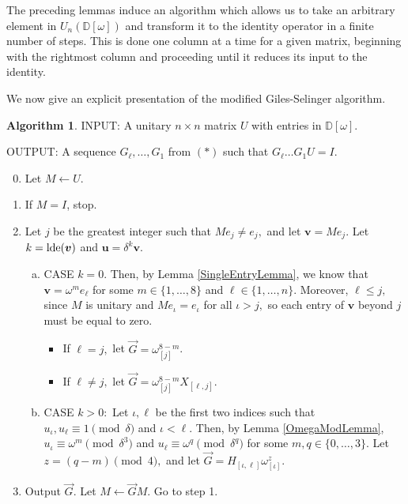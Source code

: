\documentclass{dalthesis}
\theoremstyle{theorem}
\theoremstyle{definition}
\newtheorem{algorithm}[theorem]{Algorithm}
\theoremstyle{definition}  %
\theoremstyle{definition}
\newcommand{\D}{\mathbb{D}}
\newcommand{\jay}{j}
\renewcommand{\:}{\mathbin{:}}
\newcommand{\lde}{\mathop{\rm lde}\nolimits}
\renewcommand{\vec}{\overrightarrow}
\begin{document}
The preceding lemmas induce an algorithm which allows us to take an arbitrary element in $U_n(\D[\omega])$ and transform it to the identity operator in a finite number of steps. This is done one column at a time for a given matrix, beginning with the rightmost column and proceeding until it reduces its input to the identity. 

We now give an explicit presentation of the modified Giles-Selinger algorithm.

\begin{algorithm}
\label{GSAlg}
INPUT: A unitary $n\times n$ matrix $U$ with entries in $\D[\omega].$

OUTPUT: A sequence $G_\ell,\ldots ,G_1$ from $(*)$ such that $G_\ell\ldots G_1U = I.$

\begin{enumerate}\setcounter{enumi}{-1}
\item Let $M\leftarrow U$.
\item If $M = I$, stop.
\item Let $\jay$ be the greatest integer such that $Me_{\jay}\neq e_{\jay},$ and let $\boldsymbol{v} = Me_{\jay}.$ Let $k = \lde(\boldsymbol{v})$ and $\boldsymbol{u} = \delta^k\boldsymbol{v}.$
\begin{enumerate}[(a)]
\item CASE $k = 0.$ Then, by Lemma \ref{SingleEntryLemma}, we know that $\boldsymbol{v} = \omega^me_{\ell}$ for some $m\in\{1,\ldots ,8\}$ and $\ell\in\{1,\ldots ,n\}.$ Moreover, $\ell\leq\jay,$ since $M$ is unitary and $Me_{\iota} = e_{\iota}$ for all $\iota>\jay,$ so each entry of $\boldsymbol{v}$ beyond $\jay$ must be equal to zero.
\begin{itemize}
\item If $\ell = \jay,$ let $\vec{G} = \omega^{8-m}_{[\jay]}$.

\item If $\ell\neq\jay,$ let $\vec{G} = \omega^{8-m}_{[\jay]}X_{[\ell,\jay]}.$
\end{itemize}
\item CASE $k > 0:$ Let $\iota,\ell$ be the first two indices such that $u_\iota,u_\ell\equiv 1\pmod{\delta}$ and $\iota < \ell.$ Then, by Lemma \ref{OmegaModLemma}, $u_\iota\equiv\omega^m\pmod{\delta^3}$ and $u_\ell\equiv\omega^q\pmod{\delta^q}$ for some $m,q\in\{0,\ldots ,3\}.$ Let $z = (q - m)\pmod{4},$ and let $\vec{G} = H_{[\iota,\ell]}\omega^{z}_{[\iota]}.$
\end{enumerate}
\item Output $\vec{G}.$ Let $M\leftarrow\vec{G}M.$ Go to step 1.
\end{enumerate}
\end{algorithm}
\end{document}
